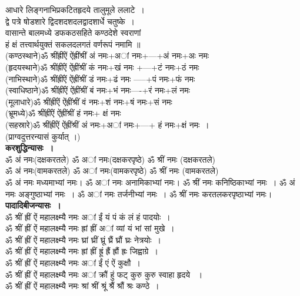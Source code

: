 \documentclass[twoside,top=1.7cm, bottom=1.7cm, outer=1cm,landscape, inner=1.5cm,a5paper,]{book}
\begin{document}
आधारे लिङ्गनाभिप्रकटितहृदये तालुमूले ललाटे~।\\
     द्वे पत्रे षोडशारे द्विदशदशदलद्वादशार्धे चतुष्के~।\\
वासान्ते बालमध्ये डफकठसहिते कण्ठदेशे स्वराणां\\
     हं क्षं तत्त्वार्थयुक्तं सकलदलगतं वर्णरूपं नमामि ॥\\[10pt]
(कण्ठस्थाने)ॐ श्रींह्रींऐं ऐंह्रींश्रीं अं नमः+अां नमः+---+अं नमः+अः नमः\\
(हृदयस्थाने)ॐ श्रींह्रींऐं ऐंह्रींश्रीं  कं नमः+खं नमः +---+टं नमः+ठं नमः  \\
(नाभिस्थाने)ॐ श्रींह्रींऐं ऐंह्रींश्रीं  डं नमः+ढं नमः -----+पं नमः+फं नमः \\
(स्वाधिष्ठाने)ॐ श्रींह्रींऐं ऐंह्रींश्रीं  बं नमः+भं नमः----+रं नमः+लं नमः \\
(मूलाधारे)ॐ श्रींह्रींऐं ऐंह्रींश्रीं  वं नमः+शं नमः+षं नमः+सं नमः \\
(भ्रूमध्ये)ॐ श्रींह्रींऐं ऐंह्रींश्रीं  हं नमः+ क्षं नमः\\
(सहस्रारे)ॐ श्रींह्रींऐं ऐंह्रींश्रीं अं नमः+अां नमः+---+ हं नमः+क्षं नमः~।\\
(प्राग्वदुत्तरन्यासं कुर्यात् ।)\\
{\bfseries करशुद्धिन्यासः~।}\\
ॐ अं नमः(दक्षकरतले) ॐ अां नमः(दक्षकरपृष्ठे) ॐ श्रीं नमः (दक्षकरतले)\\
ॐ अं नमः(वामकरतले) ॐ अां नमः(वामकरपृष्ठे) ॐ श्रीं नमः (वामकरतले)\\
ॐ अं नमः मध्यमाभ्यां नमः। ॐ अां नमः अनामिकाभ्यां नमः। ॐ श्रीं नमः कनिष्ठिकाभ्यां नमः~।
ॐ अं नमः अङ्गुष्ठाभ्यां नमः~। ॐ अां नमः तर्जनीभ्यां नमः~। ॐ श्रीं नमः करतलकरपृष्ठाभ्यां नमः।\\[10pt]
{\bfseries पादादिबीजन्यासः~।}\\
ॐ श्रीं ह्रीं ऐं महालक्ष्म्यै नमः अां ईं यं पं कं लं हं  पादयोः~।\\
ॐ श्रीं ह्रीं ऐं महालक्ष्म्यै नमः ह्रां ह्रीं अां व्यां यं भां सां मुखे~।\\
ॐ श्रीं ह्रीं ऐं महालक्ष्म्यै नमः घ्रां घ्रीं घ्रूं घ्रैं घ्रौं घ्रः नेत्रयोः~।\\
ॐ श्रीं ह्रीं ऐं महालक्ष्म्यै नमः ह्रां ह्रीं ह्रूं ह्रैं ह्रौं ह्रः जिह्वाग्रे~।\\
ॐ श्रीं ह्रीं ऐं महालक्ष्म्यै नमः अां ईं एं ऐं कुक्षौ~।\\
ॐ श्रीं ह्रीं ऐं महालक्ष्म्यै नमः अां क्रौं हुं फट् कुरु कुरु स्वाहा हृदये ~।\\
ॐ श्रीं ह्रीं ऐं महालक्ष्म्यै नमः श्रां श्रीं श्रूं श्रैं श्रौं श्रः कण्ठे~।\\
\end{document}
